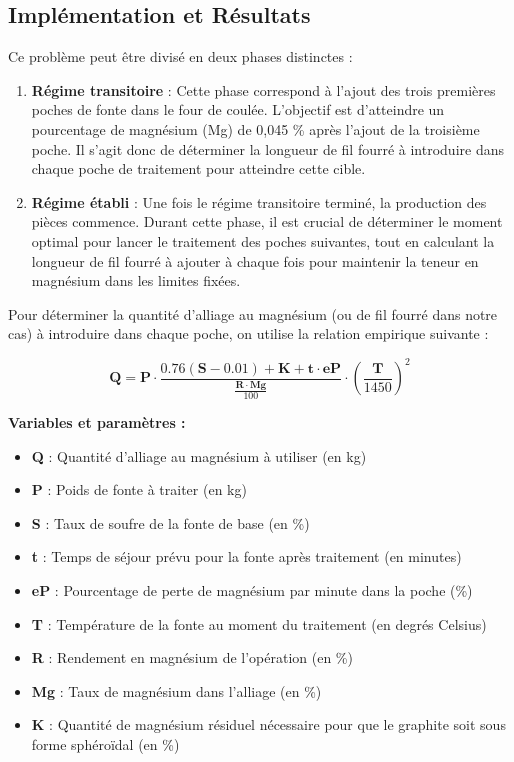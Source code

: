 \documentclass[12pt]{article}
\begin{document}
\subsection{Implémentation et Résultats}


Ce problème peut être divisé en deux phases distinctes :

\begin{enumerate}
    \item \textbf{Régime transitoire} : Cette phase correspond à l'ajout des trois 
    premières poches de fonte dans le four de coulée. L'objectif est 
    d'atteindre un pourcentage de magnésium (Mg) de 0,045 \% après l'ajout 
    de la troisième poche. Il s'agit donc de déterminer la longueur de fil 
    fourré à introduire dans chaque poche de traitement pour atteindre 
    cette cible.
    
    \item \textbf{Régime établi} : Une fois le régime transitoire terminé, 
    la production des pièces commence. Durant cette phase, il est crucial 
    de déterminer le moment optimal pour lancer le traitement des poches 
    suivantes, tout en calculant la longueur de fil fourré à ajouter à 
    chaque fois pour maintenir la teneur en magnésium dans les limites 
    fixées.
\end{enumerate}

Pour déterminer la quantité d'alliage au magnésium (ou de fil fourré dans 
notre cas) à introduire dans chaque poche, on utilise la relation 
empirique suivante :

$$
\mathbf{Q} = \mathbf{P} \cdot \frac{0.76 (\mathbf{S} - 0.01) + \mathbf{K} + \mathbf{t} \cdot \mathbf{eP}}{\frac{\mathbf{R} \cdot \mathbf{Mg}}{100}} \cdot \left(\frac{\mathbf{T}}{1450}\right)^2
$$

\textbf{Variables et paramètres :}

\begin{itemize}
    \item \textbf{Q} : Quantité d'alliage au magnésium à utiliser (en kg)
    \item \textbf{P} : Poids de fonte à traiter (en kg)
    \item \textbf{S} : Taux de soufre de la fonte de base (en \%)
    \item \textbf{t} : Temps de séjour prévu pour la fonte après traitement (en minutes)
    \item \textbf{eP} : Pourcentage de perte de magnésium par minute dans la poche (\%)
    \item \textbf{T} : Température de la fonte au moment du traitement (en degrés Celsius)
    \item \textbf{R} : Rendement en magnésium de l'opération (en \%)
    \item \textbf{Mg} : Taux de magnésium dans l'alliage (en \%)
    \item \textbf{K} : Quantité de magnésium résiduel nécessaire pour que le graphite soit sous forme sphéroïdal (en \%)
\end{itemize}
\end{document}
